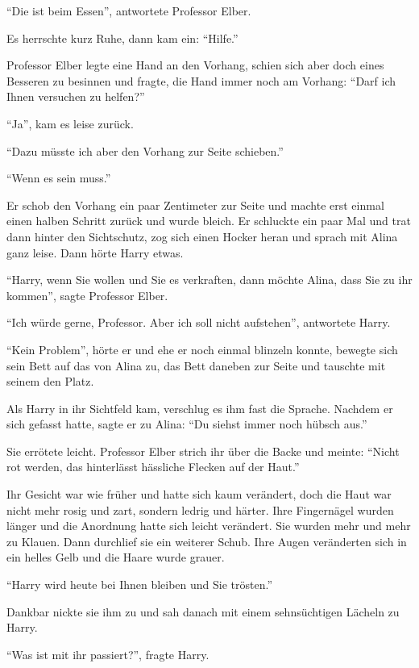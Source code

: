 \enquote{Die ist beim Essen}, antwortete Professor Elber.

Es herrschte kurz Ruhe, dann kam ein: \enquote{Hilfe.}

Professor Elber legte eine Hand an den Vorhang, schien sich aber doch eines Besseren zu besinnen und fragte, die Hand immer noch am Vorhang: \enquote{Darf ich Ihnen versuchen zu helfen?}

\enquote{Ja}, kam es leise zurück.

\enquote{Dazu müsste ich aber den Vorhang zur Seite schieben.}

\enquote{Wenn es sein muss.}

Er schob den Vorhang ein paar Zentimeter zur Seite und machte erst einmal einen halben Schritt zurück \gst und wurde bleich. Er schluckte ein paar Mal und trat dann hinter den Sichtschutz, zog sich einen Hocker heran und sprach mit Alina ganz leise. Dann hörte Harry etwas.

\enquote{Harry, wenn Sie wollen und Sie es verkraften, dann möchte Alina, dass Sie zu ihr kommen}, sagte Professor Elber.

\enquote{Ich würde gerne, Professor. Aber ich soll nicht aufstehen}, antwortete Harry.

\enquote{Kein Problem}, hörte er und ehe er noch einmal blinzeln konnte, bewegte sich sein Bett auf das von Alina zu, das Bett daneben zur Seite und tauschte mit seinem den Platz.

Als Harry in ihr Sichtfeld kam, verschlug es ihm fast die Sprache. Nachdem er sich gefasst hatte, sagte er zu Alina: \enquote{Du siehst immer noch hübsch aus.}

Sie errötete leicht. Professor Elber strich ihr über die Backe und meinte: \enquote{Nicht rot werden, das hinterlässt hässliche Flecken auf der Haut.}

Ihr Gesicht war wie früher und hatte sich kaum verändert, doch die Haut war nicht mehr rosig und zart, sondern ledrig und härter. Ihre Fingernägel wurden länger und die Anordnung hatte sich leicht verändert. Sie wurden mehr und mehr zu Klauen. Dann durchlief sie ein weiterer Schub. Ihre Augen veränderten sich in ein helles Gelb und die Haare wurde grauer.

\enquote{Harry wird heute bei Ihnen bleiben und Sie trösten.}

Dankbar nickte sie ihm zu und sah danach mit einem sehnsüchtigen Lächeln zu Harry.

\enquote{Was ist mit ihr passiert?}, fragte Harry.


